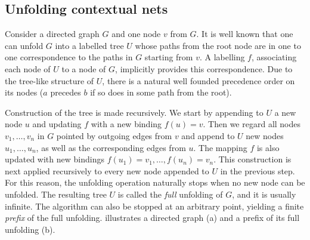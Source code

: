 \documentclass[11pt,a4paper]{article}
\begin{document}
\subsection{Unfolding contextual nets}


  Consider a directed graph $G$
and one node $v$ from $G$.  It is well known that one can unfold $G$ into a
labelled tree $U$ whose paths from the root node are in one to one
correspondence to the paths in $G$ starting from $v$.  A labelling $f$,
associating each node of $U$ to a node of $G$, implicitly provides this
correspondence.  Due to the tree-like structure of $U$, there is a natural well
founded precedence order on its nodes ($a$ precedes $b$ if so does in some path
from the root).

Construction of the tree is made recursively.  We start by appending to $U$ a
new node $u$ and updating $f$ with a new binding $f(u) = v$.  Then we regard
all nodes $v_1, \ldots, v_n$ in $G$ pointed by outgoing edges from $v$ and
append to $U$ new nodes $u_1, \ldots, u_n$, as well as the corresponding edges
from $u$.  The mapping $f$ is also updated with new bindings $f(u_1) = v_1,
\ldots, f(u_n) = v_n$.  This construction is next applied recursively to every
new node appended to $U$ in the previous step.  For this reason, the unfolding
operation naturally stops when no new node can be unfolded.  The resulting tree
$U$ is called the \emph{full} unfolding of $G$, and it is usually infinite.
The algorithm can also be stopped at an arbitrary point, yielding a finite
\emph{prefix} of the full unfolding.   illustrates a directed
graph (a) and a prefix of its full unfolding (b).

%
%
%
\end{document}
